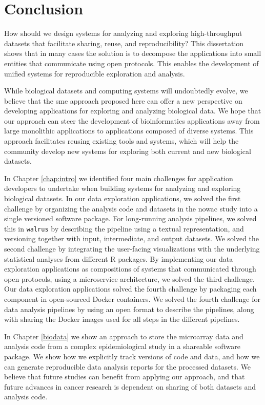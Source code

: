 \chapter{Conclusion}
How should we design systems for analyzing and exploring high-throughput
datasets that facilitate sharing, reuse, and reproducibility? This dissertation
shows that in many cases the solution is to decompose the applications into
small entities that communicate using open protocols. This enables the
development of unified systems for reproducible exploration and analysis. 

While biological datasets and computing systems will undoubtedly evolve, we
believe that the \gls{sme} approach proposed here can offer a new perspective on
developing applications for exploring and analyzing biological data. We hope
that our approach can steer the development of bioinformatics applications away
from large monolithic applications to applications composed of diverse systems.
This approach facilitates reusing existing tools and systems, which will help
the community develop new systems for exploring both current and new biological
datasets. 

In Chapter \ref{chap:intro} we identified four main challenges for application
developers to undertake when building systems for analyzing and exploring
biological datasets. In our data exploration applications, we solved the first
challenge by organizing the analysis code and datasets in the \gls{nowac} study
into a single versioned software package. For long-running analysis pipelines,
we solved this in \texttt{walrus} by describing the pipeline using a textual
representation, and versioning together with input, intermediate, and output
datasets. We solved the second challenge by integrating
the user-facing visualizations with the underlying statistical analyses from
different R packages. By implementing our data exploration applications as
compositions of systems that communicated through open protocols, using a
microservice architecture, we solved the third challenge.  Our data
exploration applications solved the fourth challenge by packaging each
component in open-sourced Docker containers. We solved the fourth challenge for
data analysis pipelines by using an open format to describe the pipelines,
along with sharing the Docker images used for all steps in the different
pipelines.

In Chapter \ref{biodata} we show an approach to store the microarray data and
analysis code from a complex epidemiological study in a shareable software
package. We show how we explicitly track versions of code and data, and how we
can generate reproducible data analysis reports for the processed datasets.
We believe that future studies can benefit from applying our approach, and that
future advances in cancer research is dependent on sharing of both datasets and
analysis code. 

